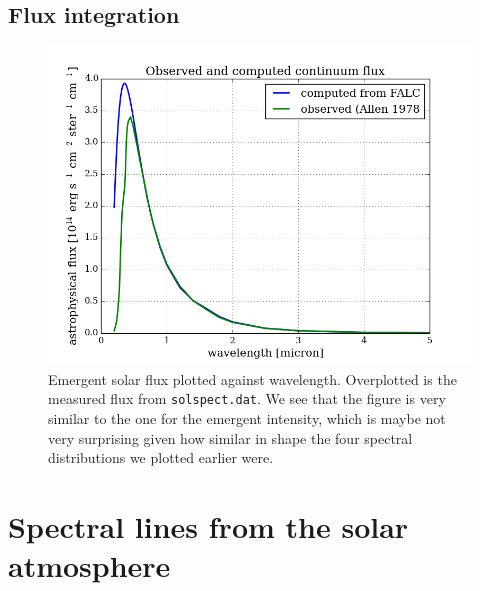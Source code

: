 \documentclass{article}
\begin{document}
\subsection{Flux integration}
\begin{figure}[H]
  \centering
  \includegraphics[scale=0.5]{../figures/task2/flux.png}
  \caption{Emergent solar flux plotted against wavelength. Overplotted is the measured flux from \texttt{solspect.dat}. We see that the figure is very similar to the one for the emergent intensity, which is maybe not very surprising given how similar in shape the four spectral distributions we plotted earlier were.}
\end{figure}

\section{Spectral lines from the solar atmosphere}
\end{document}
